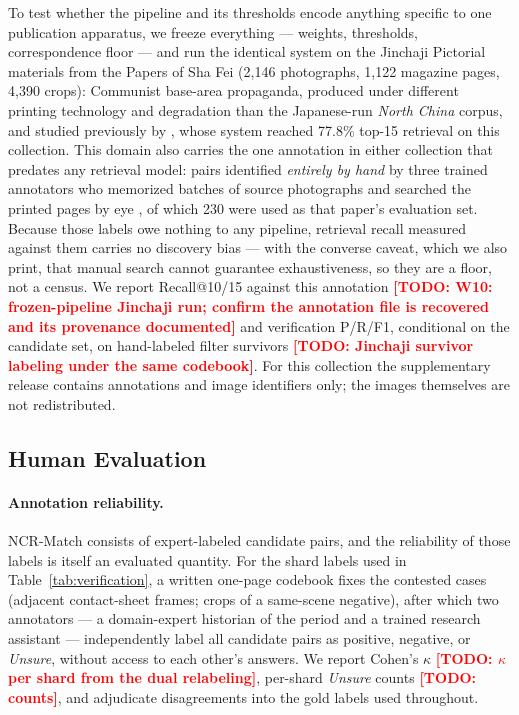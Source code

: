 \documentclass[letterpaper]{article} %
\newcommand{\todo}[1]{\textcolor{red}{\textbf{[TODO: #1]}}}
\begin{document}
To test whether the pipeline and its thresholds encode anything specific
to one publication apparatus, we freeze everything --- weights,
thresholds, correspondence floor --- and run the identical system on the
Jinchaji Pictorial materials from the Papers of Sha Fei (2{,}146
photographs, 1{,}122 magazine pages, 4{,}390 crops): Communist base-area
propaganda, produced under different printing technology and degradation
than the Japanese-run \emph{North China} corpus, and studied previously by
\citet{du2024probing}, whose system reached 77.8\% top-15 retrieval on
this collection. This domain also carries the one annotation in either
collection that predates any retrieval model: pairs identified
\emph{entirely by hand} by three trained annotators who memorized batches
of source photographs and searched the printed pages by eye
\cite{du2024probing}, of which 230 were used as that paper's evaluation
set. Because those labels owe nothing to any pipeline, retrieval recall
measured against them carries no discovery bias --- with the converse
caveat, which we also print, that manual search cannot guarantee
exhaustiveness, so they are a floor, not a census. We report Recall@10/15
against this annotation \todo{W10: frozen-pipeline Jinchaji run; confirm
the annotation file is recovered and its provenance documented} and
verification P/R/F1, conditional on the candidate set, on hand-labeled
filter survivors \todo{Jinchaji survivor labeling under the same
codebook}. For this collection the supplementary release contains
annotations and image identifiers only; the images themselves are not
redistributed.

\subsection{Human Evaluation}
\label{sec:human}

\paragraph{Annotation reliability.}
NCR-Match consists of expert-labeled candidate pairs, and the reliability
of those labels is itself an evaluated quantity. For the shard labels used
in Table~\ref{tab:verification}, a written one-page codebook fixes the
contested cases (adjacent contact-sheet frames; crops of a same-scene
negative), after which two annotators --- a domain-expert historian of the
period and a trained research assistant --- independently label all
candidate pairs as positive, negative, or \emph{Unsure}, without access
to each other's answers. We report Cohen's $\kappa$ \cite{cohen1960kappa}
\todo{$\kappa$ per shard from the dual relabeling}, per-shard
\emph{Unsure} counts \todo{counts}, and adjudicate disagreements into the
gold labels used throughout.
\end{document}
